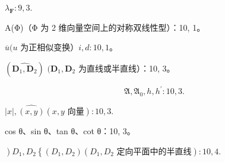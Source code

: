 \(\lambda_{\mathbf{F}}:9,3.\)

A(Φ)（Φ 为 2 维向量空间上的对称双线性型）：10, 1。

\(\overline{u} (u\) 为正相似变换）\(i,d:10,1\)。

\((\widehat{\mathbf{D}_1,\mathbf{D}_2})\) \((\mathbf{D}_1,\mathbf{D}_2\) 为直线或半直线）：10, 3。

\[
\mathfrak {A}, \mathfrak {A} _ {0}, h, h ^ {\prime}: 1 0, 3.
\]

\(|x|, \widehat{(x,y)}(x,y\text{ 向量}):10,3.\)

cos θ、sin θ、tan θ、cot θ：10, 3。

\(\left.\right)D_{1}, D_{2}\left\{\left(D_{1}, D_{2}\right)\left(D_{1}, D_{2} \text{ 定向平面中的半直线}\right): 10, 4.\right.\)

